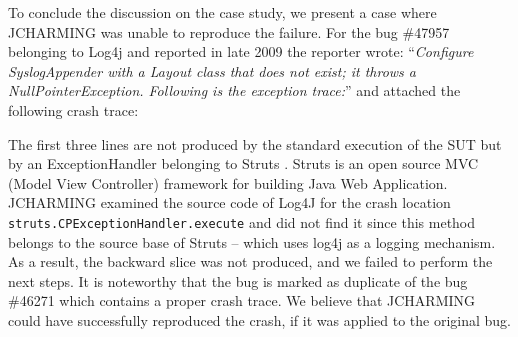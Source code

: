 \documentclass[times]{smrauth}
\begin{document}
To conclude the discussion on the case study, we present a
case where JCHARMING was unable to reproduce the failure.
For the bug \#47957 belonging to Log4j and reported in late
2009 the reporter wrote: ``{\it Configure SyslogAppender with a Layout class that does not
exist; it throws a NullPointerException. Following is the
exception trace:}'' and attached the following crash trace:

\vspace*{0.3cm}

\noindent{}

\vspace*{0.3cm}

The first three lines are not produced by the standard
execution of the SUT but by an ExceptionHandler belonging
to Struts \cite{ApacheSoftwareFoundation2000}. Struts is an open source MVC (Model View
Controller) framework for building Java Web Application.
JCHARMING examined the source code of Log4J for the
crash location {\tt struts.CPExceptionHandler.execute} and did not
find it since this method belongs to the source base of Struts
-- which uses log4j as a logging mechanism. As a result, the
backward slice was not produced, and we failed to perform the
next steps. It is noteworthy that the bug is marked as duplicate
of the bug \#46271 which contains a proper crash trace. We
believe that JCHARMING could have successfully
reproduced the crash, if it was applied to the original bug. \\
\end{document}
